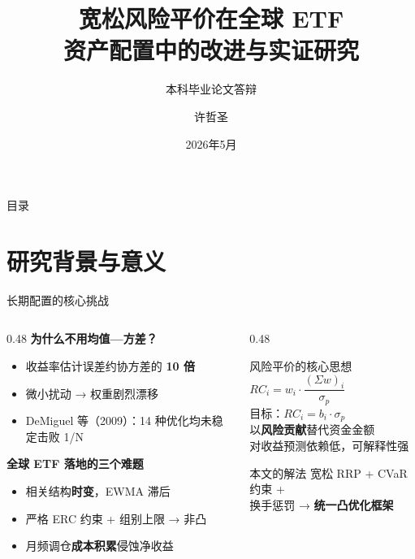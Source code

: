 \documentclass[aspectratio=169,11pt]{beamer}
\title{宽松风险平价在全球 ETF\\资产配置中的改进与实证研究}
\subtitle{本科毕业论文答辩}
\author{许哲圣}
\date{2026年5月}
\begin{document}
\begin{frame}
  \titlepage
\end{frame}

\begin{frame}{目录}
  \tableofcontents
\end{frame}

\section{研究背景与意义}

\begin{frame}{长期配置的核心挑战}
  \begin{columns}[T]
    \begin{column}{0.48\textwidth}
      \textbf{为什么不用均值—方差？}
      \begin{itemize}
        \item 收益率估计误差约协方差的 \textbf{10 倍}
        \item 微小扰动 → 权重剧烈漂移
        \item DeMiguel 等（2009）：14 种优化均未稳定击败 1/N
      \end{itemize}
      \vspace{0.6em}
      \textbf{全球 ETF 落地的三个难题}
      \begin{itemize}
        \item 相关结构\textbf{时变}，EWMA 滞后
        \item 严格 ERC 约束 + 组别上限 → 非凸
        \item 月频调仓\textbf{成本积累}侵蚀净收益
      \end{itemize}
    \end{column}
    \begin{column}{0.48\textwidth}
      \begin{block}{风险平价的核心思想}
        \centering\large
        $RC_i = w_i \cdot \dfrac{(\Sigma w)_i}{\sigma_p}$\\[0.5em]
        \normalsize 目标：$RC_i = b_i \cdot \sigma_p$\\[0.4em]
        \small 以\textbf{风险贡献}替代资金金额\\
        对收益预测依赖低，可解释性强
      \end{block}
      \vspace{0.5em}
      \begin{alertblock}{本文的解法}
        宽松 RRP + CVaR 约束 +\\
        换手惩罚 → \textbf{统一凸优化框架}
      \end{alertblock}
    \end{column}
  \end{columns}
\end{frame}
\end{document}
